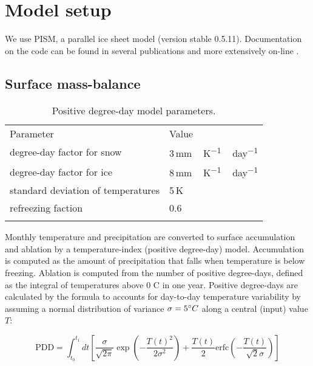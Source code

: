 
\section{Model setup}
\label{sec:model}

We use PISM, a parallel ice sheet model (version stable 0.5.11). Documentation on the code can be found in several publications \citep[e.g.,][]{bueler-brown-2009,winkelmann-etal-2011,aschwanden-etal-2012} and more extensively on-line \citep[{\url{http://www.pism-docs.org}},][]{web:pism}.

\subsection{Surface mass-balance}

\begin{table}[t]
	\caption{Positive degree-day model parameters.}
	\label{tab:pdd}
	\vskip4mm
	\centering
	\begin{tabular}{ll}
		\tophline
		Parameter& Value\\
		\middlehline
		degree-day factor for snow & 3\,\unit{mm\,K^{-1}\,day^{-1}}\\
		degree-day factor for ice & 8\,\unit{mm\,K^{-1}\,day^{-1}}\\
		standard deviation of temperatures & 5\,K\\
		refreezing faction & 0.6 \\
		\bottomhline
	\end{tabular}
\end{table}

Monthly temperature and precipitation are converted to surface accumulation and ablation by a temperature-index (positive degree-day) model. Accumulation is computed as the amount of precipitation that falls when temperature is below freezing. Ablation is computed from the number of positive degree-days, defined as the integral of temperatures above 0\,\degree\,C in one year. Positive degree-days are calculated by the \citet{calov-greve-2005} formula to accounts for day-to-day temperature variability by assuming a normal distribution of variance $\sigma=5^{\circ} C$ along a central (input) value $T$:

\begin{equation}
	\mathrm{PDD} = \int_{t_0}^{t_1} dt \left[
		\frac{\sigma}{\sqrt{2\pi}}
		\exp\left({-\frac{T(t)^2}{2\sigma^2}}\right)
		+\frac{T(t)}{2}
		\mathrm{erfc} \left(-\frac{T(t)}{\sqrt{2}\sigma}\right)
	\right]
\end{equation}

